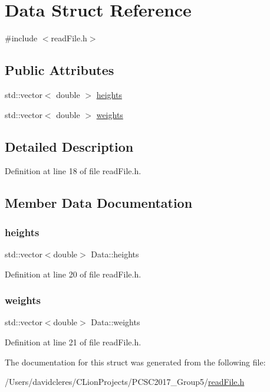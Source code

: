 \hypertarget{struct_data}{}\section{Data Struct Reference}
\label{struct_data}


{\ttfamily \#include $<$read\+File.\+h$>$}

\subsection*{Public Attributes}
\begin{DoxyCompactItemize}
\item 
std\+::vector$<$ double $>$ \mbox{\hyperlink{struct_data_af8859b12fd48d0b1f8136b82a54f269e}{heights}}
\item 
std\+::vector$<$ double $>$ \mbox{\hyperlink{struct_data_a240f15bb7792f4b6326f760f2a5020cd}{weights}}
\end{DoxyCompactItemize}


\subsection{Detailed Description}


Definition at line 18 of file read\+File.\+h.



\subsection{Member Data Documentation}
\mbox{\label{struct_data_af8859b12fd48d0b1f8136b82a54f269e}} 
\subsubsection{\texorpdfstring{heights}{heights}}
{\footnotesize\ttfamily std\+::vector$<$double$>$ Data\+::heights}



Definition at line 20 of file read\+File.\+h.

\mbox{\label{struct_data_a240f15bb7792f4b6326f760f2a5020cd}} 
\subsubsection{\texorpdfstring{weights}{weights}}
{\footnotesize\ttfamily std\+::vector$<$double$>$ Data\+::weights}



Definition at line 21 of file read\+File.\+h.



The documentation for this struct was generated from the following file\+:\begin{DoxyCompactItemize}
\item 
/\+Users/davidcleres/\+C\+Lion\+Projects/\+P\+C\+S\+C2017\+\_\+\+Group5/\mbox{\hyperlink{read_file_8h}{read\+File.\+h}}\end{DoxyCompactItemize}
